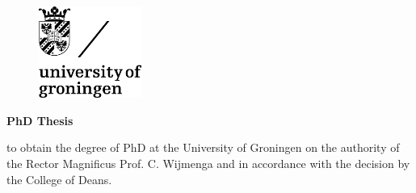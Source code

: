 \begin{titlepage}

\begin{center}

\vspace*{2\bigskipamount}

{\makeatletter
\titlestyle\bfseries\LARGE\@title
\makeatother}

{\makeatletter
\ifx\@subtitle\undefined\else
    \bigskip
    \titlefont\titleshape\Large\@subtitle
\fi
\makeatother}

\end{center}

\cleardoublepage
\thispagestyle{empty}
	\begin{figure}[!h]
		\includegraphics[width=0.3\textwidth]{title/rugr_logoenv_zwart_rgb.jpeg}
	\end{figure}
\begin{center}


\vspace*{2\bigskipamount}

{\makeatletter
\titlestyle\bfseries\LARGE\@title
\makeatother}

{\makeatletter
\ifx\@subtitle\undefined\else
    \bigskip
    \titlefont\titleshape\Large\@subtitle
\fi
\makeatother}

\vfill


{\Large\titlefont\bfseries PhD Thesis}

\bigskip
\bigskip

to obtain the degree of PhD at the University of Groningen
on the authority of the Rector Magnificus Prof. C. Wijmenga and in accordance with
the decision by the College of Deans.


\end{center}
\end{titlepage}
